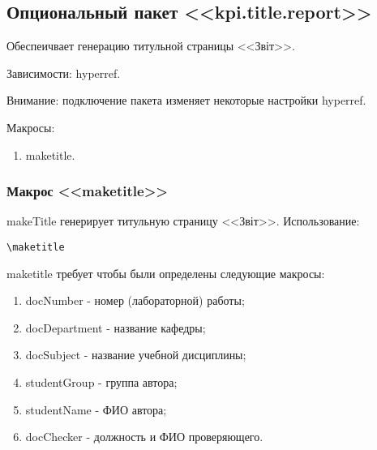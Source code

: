 \subsection{Опциональный пакет <<kpi.title.report>>}
Обеспеичвает генерацию титульной страницы <<Звіт>>.\par
Зависимости: hyperref.\par
Внимание: подключение пакета изменяет некоторые настройки hyperref.\par
Макросы:
\begin{enumerate}
\item maketitle.
\end{enumerate}
\subsubsection{Макрос <<maketitle>>}
makeTitle генерирует титульную страницу <<Звіт>>.
Использование:{\small
\begin{verbatim}
\maketitle
\end{verbatim}}
\normalsize
maketitle требует чтобы были определены следующие макросы:
\begin{enumerate}
\item docNumber - номер (лабораторной) работы; 
\item docDepartment - название кафедры;
\item docSubject - название учебной дисциплины;
\item studentGroup - группа автора;
\item studentName - ФИО автора;
\item docChecker - должность и ФИО проверяющего.
\end{enumerate}

